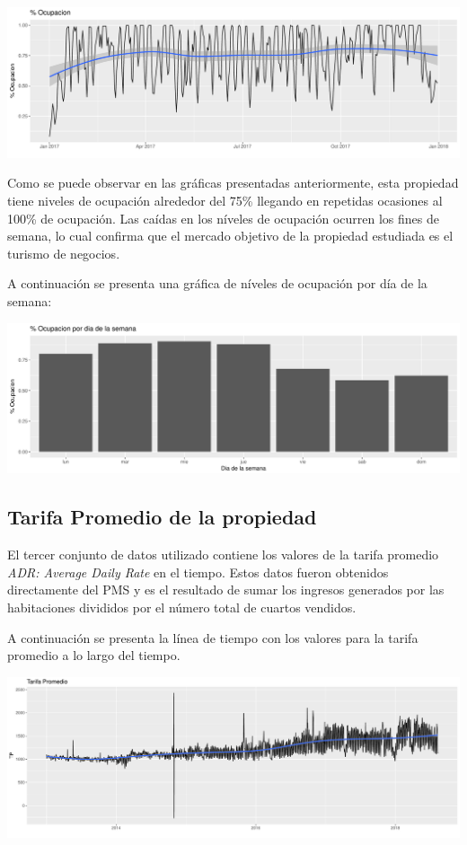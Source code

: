\color{fgcolor}
\includegraphics[width=\maxwidth]{Figures/Ocupacion-1} 

Como se puede observar en las gráficas presentadas anteriormente, esta propiedad tiene niveles de ocupación alrededor del 75\% llegando en repetidas ocasiones al 100\% de ocupación. Las caídas en los níveles de ocupación ocurren los fines de semana, lo cual confirma que el mercado objetivo de la propiedad estudiada es el turismo de negocios.

A continuación se presenta una gráfica de níveles de ocupación por día de la semana:

\color{fgcolor}
\includegraphics[width=\maxwidth]{Figures/Ocupacion_Dia_Semana-1}


\subsection*{Tarifa Promedio de la propiedad}

El tercer conjunto de datos utilizado contiene los valores de la tarifa promedio \emph{ADR: Average Daily Rate} en el tiempo. Estos datos fueron obtenidos directamente del PMS y es el resultado de sumar los ingresos generados por las habitaciones divididos por el número total de cuartos vendidos. 

A continuación se presenta la línea de tiempo con los valores para la tarifa promedio a lo largo del tiempo.

\color{fgcolor}
\includegraphics[width=\maxwidth]{figures/IndicadoresTarifaPromedio-1} 

